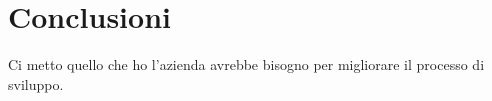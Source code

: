 \chapter{Conclusioni}
\label{cap:conclusioni}

Ci metto quello che ho l'azienda avrebbe bisogno per migliorare il processo di
sviluppo.
